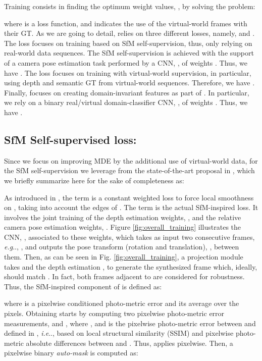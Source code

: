 \documentclass[journal]{IEEEtran}
\makeatletter
\DeclareRobustCommand\onedot{\futurelet\@let@token\@onedot}
\def\@onedot{\ifx\@let@token.\else.\null\fi\xspace}
\def\eg{\emph{e.g}\onedot} \def\Eg{\emph{E.g}\onedot}
\def\ie{\emph{i.e}\onedot} \def\Ie{\emph{I.e}\onedot}
\newcommand{\Fig}[1]{Fig. \ref{fig:#1}}
\makeatother
\begin{document}
Training  consists in finding the optimum weight values, , by solving the problem:

\noindent where  is a loss function, and  indicates the use of the virtual-world frames with their GT. As we are going to detail,  relies on three different losses, namely,  and . The loss  focuses on training  based on SfM self-supervision, thus, only relying on real-world data sequences. The SfM self-supervision is achieved with the support of a camera pose estimation task performed by a CNN, , of weights . Thus, we have . The loss  focuses on training  with virtual-world supervision, in particular, using depth and semantic GT from virtual-world sequences. Therefore, we have . Finally,  focuses on creating domain-invariant features  as part of . In particular, we rely on a binary real/virtual domain-classifier CNN, , of weights . Thus, we have .

\subsection{SfM Self-supervised loss: }
\label{ssec:slfloss}
Since we focus on improving MDE by the additional use of virtual-world data, for the SfM self-supervision we leverage from the state-of-the-art proposal in \cite{Godard:2019MonoDepth2}, which we briefly summarize here for the sake of completeness as:

As introduced in \cite{Godard:2017}, the term  is a constant weighted loss to force local smoothness on , taking into account the edges of . The term  is the actual SfM-inspired loss. It involves the joint training of the depth estimation weights, , and the relative camera pose estimation weights, . Figure \ref{fig:overall_training} illustrates the CNN, , associated to these weights, which takes as input two consecutive frames, {\eg}, , and outputs the pose transform (rotation and translation), , between them. Then, as can be seen in \Fig{overall_training}, a projection module takes  and the depth estimation , to generate the synthesized frame  which, ideally, should match . In fact, both frames adjacent to  are considered for robustness. Thus, the SfM-inspired component of  is defined as:

where  is a pixelwise conditioned photo-metric error and  its average over the pixels. Obtaining  starts by computing two pixelwise photo-metric error measurements,  and , where , and  is the pixelwise photo-metric error between  and  defined in \cite{Godard:2017}, {\ie}, based on local structural similarity (SSIM) and pixelwise photo-metric absolute differences between  and . Thus,  applies pixelwise. Then, a pixelwise binary \emph{auto-mask} \cite{Godard:2019MonoDepth2} is computed as:
\end{document}
